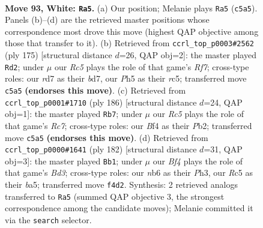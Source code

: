 \documentclass[11pt]{article}
\begin{document}
\clearpage

\begin{figure}[p]\centering
\begin{subfigure}{0.46\textwidth}\centering
\resizebox{\linewidth}{!}{%
\newchessgame
\chessboard[
  setfen={6k1/3r4/1n3P2/2R4P/p4B2/P7/7K/8 w - - 3 93},
  showmover=false,
  pgfstyle=straightmove, color=movearrow, markmove={c5-a5}
]}
\caption{}
\end{subfigure}\hfill
\begin{subfigure}{0.46\textwidth}\centering
\resizebox{\linewidth}{!}{%
\newchessgame
\chessboard[
  setfen={8/3B3k/8/2R3p1/7p/4N3/5rPK/1b6 b - - 3 88},
  showmover=false,
  pgfstyle=straightmove, color=movearrow, markmove={f2-d2}
]}
\caption{}
\end{subfigure}
\\[4pt]
\begin{subfigure}{0.46\textwidth}\centering
\resizebox{\linewidth}{!}{%
\newchessgame
\chessboard[
  setfen={6r1/P1R5/3p4/3P4/3n1k2/8/KP6/8 w - - 1 94},
  showmover=false,
  pgfstyle=straightmove, color=movearrow, markmove={c7-b7}
]}
\caption{}
\end{subfigure}\hfill
\begin{subfigure}{0.46\textwidth}\centering
\resizebox{\linewidth}{!}{%
\newchessgame
\chessboard[
  setfen={8/8/8/b3k1p1/8/3B1PPP/8/5K2 w - - 1 92},
  showmover=false,
  pgfstyle=straightmove, color=movearrow, markmove={d3-b1}
]}
\caption{}
\end{subfigure}
\caption{\textbf{Move 93, White: \texttt{Ra5}.} (a) Our position; Melanie plays \texttt{Ra5} (\texttt{c5a5}). Panels (b)--(d) are the retrieved master positions whose correspondence most drove this move (highest QAP objective among those that transfer to it). (b) Retrieved from \texttt{ccrl\_top\_p0003\#2562} (ply 175) [structural distance $d$=26, QAP obj=2]: the master played \texttt{Rd2}; under $\mu$ our \emph{Rc5} plays the role of that game's \emph{Rf7}; cross-type roles: our \emph{r}d7 as their \emph{b}d7, our \emph{P}h5 as their \emph{r}c5; transferred move \texttt{c5a5} \textbf{(endorses this move)}. (c) Retrieved from \texttt{ccrl\_top\_p0001\#1710} (ply 186) [structural distance $d$=24, QAP obj=1]: the master played \texttt{Rb7}; under $\mu$ our \emph{Rc5} plays the role of that game's \emph{Rc7}; cross-type roles: our \emph{B}f4 as their \emph{P}b2; transferred move \texttt{c5a5} \textbf{(endorses this move)}. (d) Retrieved from \texttt{ccrl\_top\_p0000\#1641} (ply 182) [structural distance $d$=31, QAP obj=3]: the master played \texttt{Bb1}; under $\mu$ our \emph{Bf4} plays the role of that game's \emph{Bd3}; cross-type roles: our \emph{n}b6 as their \emph{P}h3, our \emph{R}c5 as their \emph{b}a5; transferred move \texttt{f4d2}. Synthesis: 2 retrieved analogs transferred to \texttt{Ra5} (summed QAP objective 3, the strongest correspondence among the candidate moves); Melanie committed it via the \texttt{search} selector.}
\label{fig:thought-m184}
\end{figure}
\end{document}
